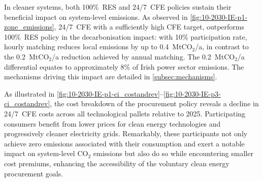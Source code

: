 \documentclass[11pt, 5p, nopreprintline]{elsarticle}
\begin{document}
In cleaner systems, both 100\%~RES and 24/7~CFE policies sustain their beneficial impact on system-level emissions.
As observed in \cref{fig:10-2030-IE-p1-zone_emissions}, 24/7~CFE with a sufficiently high CFE target, outperforms 100\%~RES policy in the decarbonisation impact: with 10\% participation rate, hourly matching reduces local emissions by up to 0.4~Mt\(\text{CO}_2\)/a, in contrast to the 0.2~Mt\(\text{CO}_2\)/a reduction achieved by annual matching.
The 0.2~Mt\(\text{CO}_2\)/a differential equates to approximately 8\% of Irish power sector emissions.
The mechanisms driving this impact are detailed in \cref{subsec:mechanisms}.

As illustrated in \cref{fig:10-2030-IE-p1-ci_costandrev}--\cref{fig:10-2030-IE-p3-ci_costandrev}, the cost breakdown of the procurement policy reveals a decline in 24/7~CFE costs across all technological pallets relative to 2025.
Participating consumers benefit from lower prices for clean energy technologies and progressively cleaner electricity grids.
Remarkably, these participants not only achieve zero emissions associated with their consumption and exert a notable impact on system-level \(\text{CO}_2\) emissions but also do so while encountering smaller cost premiums, enhancing the accessibility of the voluntary clean energy procurement goals.
\end{document}
